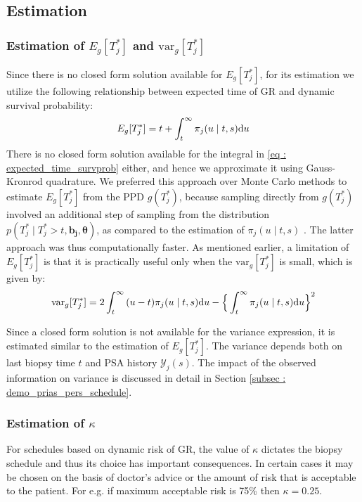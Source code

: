 
\subsection{Estimation}
\subsubsection{Estimation of $E_g[T^*_j]$ and $\mbox{var}_g[T^*_j]$}
Since there is no closed form solution available for $E_g[T^*_j]$, for its estimation we utilize the following relationship between expected time of GR and dynamic survival probability:
\begin{equation}
\label{eq : expected_time_survprob}
E_g[T^*_j] = t + \int_t^\infty \pi_j(u \mid t, s) \rmn{d} u
\end{equation}
There is no closed form solution available for the integral in \ref{eq : expected_time_survprob} either, and hence we approximate it using Gauss-Kronrod quadrature. We preferred this approach over Monte Carlo methods to estimate $E_g[T^*_j]$ from the PPD $g(T^*_j)$, because sampling directly from $g(T^*_j)$ involved an additional step of sampling from the distribution $p(T^*_j \mid T^*_j > t, \boldsymbol{b_j}, \boldsymbol{\theta})$, as compared to the estimation of $\pi_j(u \mid t, s)$ \citep{rizopoulos2011dynamic}. The latter approach was thus computationally faster. As mentioned earlier, a limitation of $E_g[T^*_j]$ is that it is practically useful only when the $\mbox{var}_g[T^*_j]$ is small, which is given by:
\begin{equation}
\label{eq : var_time_survprob}
\mbox{var}_g[T^*_j] = 2 \int_t^\infty {(u-t) \pi_j(u \mid t, s) \rmn{d} u} - \Big\{\int_t^\infty \pi_j(u \mid t, s) \rmn{d} u\Big\}^2
\end{equation}

Since a closed form solution is not available for the variance expression, it is estimated similar to the estimation of $E_g[T^*_j]$. The variance depends both on last biopsy time $t$ and PSA history $\mathcal{Y}_j(s)$. The impact of the observed information on variance is discussed in detail in Section \ref{subsec : demo_prias_pers_schedule}.

\subsubsection{Estimation of $\kappa$}
\label{subsubsec : kappa_estimation}
For schedules based on dynamic risk of GR, the value of $\kappa$ dictates the biopsy schedule and thus its choice has important consequences. In certain cases it may be chosen on the basis of doctor's advice or the amount of risk that is acceptable to the patient. For e.g. if maximum acceptable risk is 75\% then $\kappa = 0.25$.

